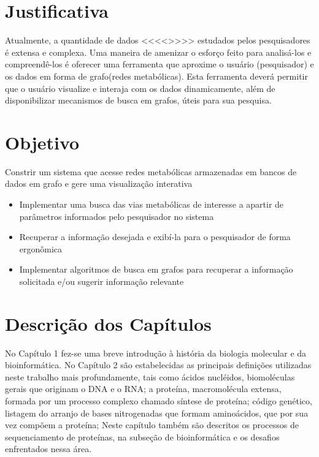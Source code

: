 \section{Justificativa}

\indent 

Atualmente, a quantidade de dados <<<<>>>> estudados pelos pesquisadores é extensa e complexa. Uma maneira de amenizar o esforço feito para analisá-los e compreendê-los é oferecer uma ferramenta que aproxime o usuário (pesquisador) e os dados em forma de grafo(redes metabólicas). Esta ferramenta deverá permitir que o usuário visualize e interaja com os dados dinamicamente, além de disponibilizar mecanismos de busca em grafos, úteis para sua pesquisa.


\section{Objetivo}

\indent 
Constrir um sistema que acesse redes metabólicas armazenadas em bancos de dados em grafo e gere uma visualização interativa
\begin{itemize}
 \item Implementar uma busca das vias metabólicas de interesse a apartir de parâmetros informados pelo pesquisador no sistema
 \item Recuperar a informação desejada e exibí-la para o pesquisador de forma ergonômica
 \item Implementar algoritmos de busca em grafos para recuperar a informação solicitada e/ou sugerir informação relevante
\end{itemize}

\section{Descrição dos Capítulos}

\indent No Capítulo 1 fez-se uma breve introdução à história da biologia molecular e da bioinformática. No Capítulo 2 são estabelecidas as principais definições utilizadas neste trabalho mais profundamente, tais como ácidos nucléidos, biomoléculas gerais que originam o DNA e o RNA; a proteína, macromolécula extensa, formada por um processo complexo chamado síntese de proteína; código genético, listagem do arranjo de bases nitrogenadas que formam aminoácidos, que por sua vez compõem a proteína; Neste capítulo também são descritos os processos de sequenciamento de proteínas, na subseção de bioinformática e os desafios enfrentados nessa área. \\

